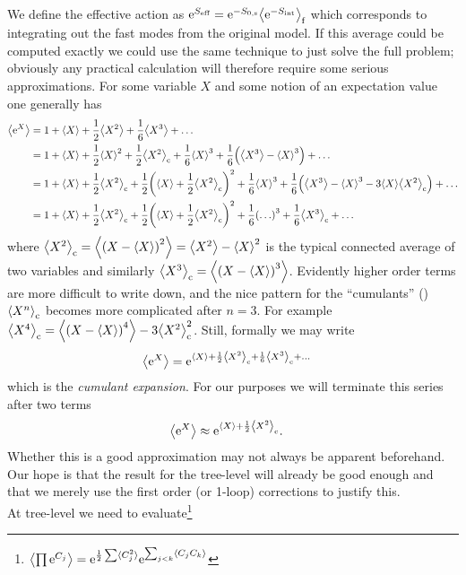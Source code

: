 \documentclass[english, parskip=full]{scrartcl}
\begin{document}
We define the effective action as $\powe{S_\text{eff}} = \powe{-S_{0,\s}} \bra*{\powe{-S_\Text{int}}}_\f$ which corresponds to integrating out the fast modes from the original model.
If this average could be computed exactly we could use the same technique to just solve the full problem; obviously any practical calculation will therefore require some serious approximations.
For some variable $X$ and some notion of an expectation value one generally has
\begin{align}
\bra*{\powe{X}} &= 1 + \bra*{X} + \frac{1}{2} \bra*{X^2} + \frac{1}{6} \bra*{X^3} + \dots \\
&= 1 + \bra*{X} + \frac{1}{2} \bra*{X}^2 + \frac{1}{2} \bra*{X^2}_\c + \frac{1}{6} \bra*{X}^3 + \frac{1}{6} \kla*{\bra*{X^3} - \bra*{X}^3} + \dots\\
&= 1 + \bra*{X} + \frac{1}{2} \bra*{X^2}_\c + \frac{1}{2} \kla*{\bra*{X} + \frac{1}{2} \bra*{X^2}_\c}^2 + \frac{1}{6} \bra*{X}^3 + \frac{1}{6} \kla*{\bra*{X^3} - \bra*{X}^3 - 3\bra*{X} \bra*{X^2}_\c} + \dots\\
&= 1 + \bra*{X} + \frac{1}{2} \bra*{X^2}_\c + \frac{1}{2} \kla*{\bra*{X} + \frac{1}{2}\bra*{X^2}_\c}^2 + \frac{1}{6}\kla*{\dots}^3 + \frac{1}{6} \bra*{X^3}_\c + \dots
\end{align}
where $\bra*{X^2}_\c = \bra*{\kla*{X - \bra*{X}}^2} = \bra*{X^2} - \bra*{X}^2$ is the typical connected average of two variables and similarly $\bra*{X^3}_\c = \bra*{\kla*{X - \bra*{X}}^3}$.
Evidently higher order terms are more difficult to write down, and the nice pattern for the ``cumulants'' () $\bra*{X^n}_\c$ becomes more complicated after $n=3$.
For example $\bra*{X^4}_\c = \bra*{\kla*{X - \bra*{X}}^4} - 3 \bra*{X^2}_\c^2$.
Still, formally we may write
\begin{align}
\bra*{\powe{X}} &= \powe{\bra*{X} + \frac{1}{2}\bra*{X^2}_\c + \frac{1}{6} \bra*{X^3}_\c + \dots}
\end{align}
which is the \emph{cumulant expansion}.
For our purposes we will terminate this series after two terms
\begin{align}
\bra*{\powe{X}} &\approx \powe{\bra*{X} + \frac{1}{2} \bra*{X^2}_\c}.
\end{align}
Whether this is a good approximation may not always be apparent beforehand.
Our hope is that the result for the tree-level will already be good enough and that we merely use the first order (or 1-loop) corrections to justify this.\\
At tree-level we need to evaluate\footnote{$\bra*{\prod \powe{C_j}} = \powe{\frac{1}{2} \sum \bra{C_j^2}} \powe{\sum_{j<k} \bra*{C_jC_k}}$}
\end{document}
